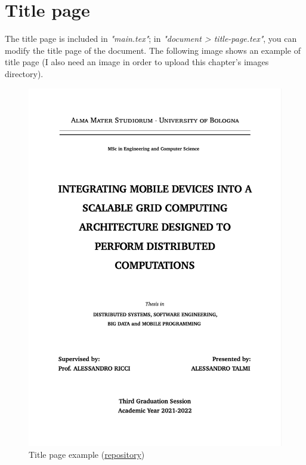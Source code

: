 \section{Title page}
The title page is included in \textit{"main.tex"}; in \textit{"document > title-page.tex"}, you can modify the title page of the document. The following image shows an example of title page (I also need an image in order to upload this chapter's images directory).

\begin{figure}[!ht]
    \centering
    \includegraphics[scale=0.3]{document/chapters/other_components/images/title_page_example.png}
    \caption{Title page example (\href{https://github.com/Tale152/master-thesis}{repository})}
    \label{fig:title_page_example}
\end{figure}
